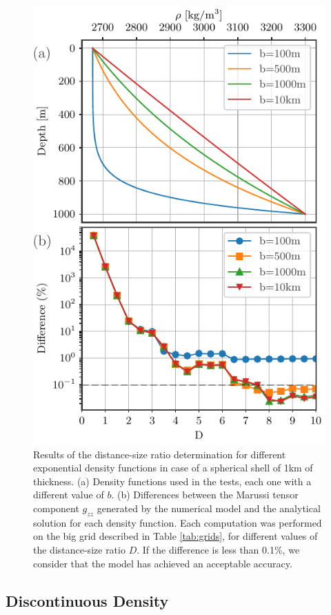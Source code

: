 \documentclass[extra]{gji}
\begin{document}
\begin{figure}
\centering
\includegraphics[width=0.9\linewidth]{figures/exponential-b-thin.pdf}
\caption{
    Results of the distance-size ratio determination for different exponential density functions in case of a spherical shell of 1km of thickness.
    (a) Density functions used in the tests, each one with a different value of $b$.
    (b) Differences between the Marussi tensor component $g_{zz}$ generated by the numerical model and the analytical solution for each density function. Each computation was performed on the big grid described in Table \ref{tab:grids}, for different values of the distance-size ratio $D$. If the difference is less than 0.1\%, we consider that the model has achieved an acceptable accuracy.
}
\label{fig:D-exp-power-thin}
\end{figure}

\subsection{Discontinuous Density}
\end{document}
